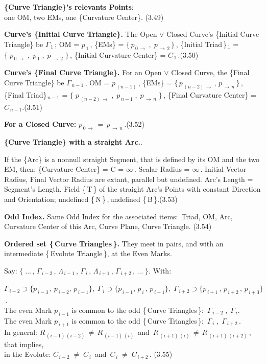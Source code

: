 \documentclass[12pt]{article} %
\begin{document}
\noindent \textbf{\{Curve Triangle\}'s relevants Points}:\\ one OM, two EMs, one \{Curvature Center\}. (3.49) 

\noindent \textbf{Curve's \{Initial Curve Triangle\}.} The Open $\vee$ Closed Curve's \{Initial Curve Triangle\} be $\Gamma_{\,1}$\,; OM = $p_{\,1}$\,, \{EMs\} = $\{\,p_{\,0\,\to}\;,\;p_{\,\to\,2}\,\}$\,, \{Initial Triad\,\}$_{\,1}$ = $\{\;p_{\,0\,\to}\;,\;p_{\,1}\;,\;p_{\,\to\,2}\;\}$\,, \{Initial Curvature Center\} = $C_{\,1}$\,.\qquad \qquad (3.50)

\noindent \textbf{Curve's \{Final Curve Triangle\}.} For an Open $\vee$ Closed Curve, the \{Final Curve Triangle\} be $\Gamma_{\,n-1}$\,, OM = $p_{\,(n-1)}$\,, \{EMs\} = $\{\,p_{\,(n-2)\,\to}\,,\,p_{\,\to\,n}\,\}$\,, \{Final Triad\}$_{\,n-1}$ = $\{\;p_{\,(n-2)\,\to}\;,\;p_{\,n-1}\;,\;p_{\,\to\,n}\;\}$\,, \{Final Curvature Center\} = $C_{\,n-1}$\;.\qquad (3.51)

\noindent \textbf{For a Closed Curve:} \qquad $p_{\,0\,\to}\,=\,p_{\,\to\,n}$\,.\qquad (3.52)  

\noindent \textbf{\{Curve Triangle\} with a straight Arc.}. 

\noindent If the \{Arc\} is a nonnull straight Segment, that is defined by its OM and the two EM, then:\; \{Curvature Center\} = C = $\infty$\,. Scalar Radius = $\infty$\,. Initial Vector Radius, Final Vector Radius are extant,  parallel but undefined. Arc's Length = Segment's Length. Field \{\,T\,\} of the straight Arc's Points with constant Direction and Orientation; undefined \{\,N\,\}\,,\,undefined \{\,B\,\}.\qquad (3.53)  

\noindent \textbf{Odd Index.} Same Odd Index for the associated items:\, Triad, OM, Arc,  Curvature Center of this Arc, Curve Plane, Curve Triangle. \qquad (3.54)

\noindent \textbf{Ordered set \{\,Curve Triangles\,\}.}  They meet in pairs, and with an intermediate \{\,Evolute Triangle\,\}, at the Even Marks. 

 \noindent Say: \; $\big\{\;\ldots\,,\,\Gamma_{\,i-2}\,,\,\Lambda_{\,i-1}\,,\,\Gamma_{\,i}\,,\,\Lambda_{\,i+1}\,,\,\Gamma_{\,i+2}\,,\,\ldots\;\big\}$. With:

\noindent $\Gamma_{\,i-2}\supset\big\{p_{\,i-3}\,,\,p_{\,i-2},\,p_{\,i-1}\big\},\;\Gamma_{\,i}\supset\big\{p_{\,i-1},\,p_{\,i}\,,\,p_{\,i+1}\big\},\;\Gamma_{\,i+2}\supset\big\{p_{\,i+1}\,,\,p_{\,i+2}\,,\,p_{\,i+3}\big\}$\,.\\ The even Mark $p_{\,i-1}$ is common to the odd \{\,Curve Triangles\,\}:\, $\Gamma_{\,i-2}\;,\;\Gamma_{\,i}$\;.\\The even Mark $p_{\,i+1}$ is common to the odd \{\,Curve Triangles\,\}:\, $\Gamma_{\,i}\;,\;\Gamma_{\,i+2}$\,.\\In general: $R_{\,(i-1)\,(i-2)}\,\neq\,R_{\,(i-1)\,(i)}$\, and \,$R_{\,(i+1)\,(i)}\,\neq\,R_{\,(i+1)\,(i+2)}$\,, that implies,\\ in the Evolute: \quad $C_{\,i-2}\;\neq\;C_{\,i}$\, and \,$C_{\,i}\;\neq\;C_{\,i+2}$\,. \qquad \qquad (3.55)
\end{document}

